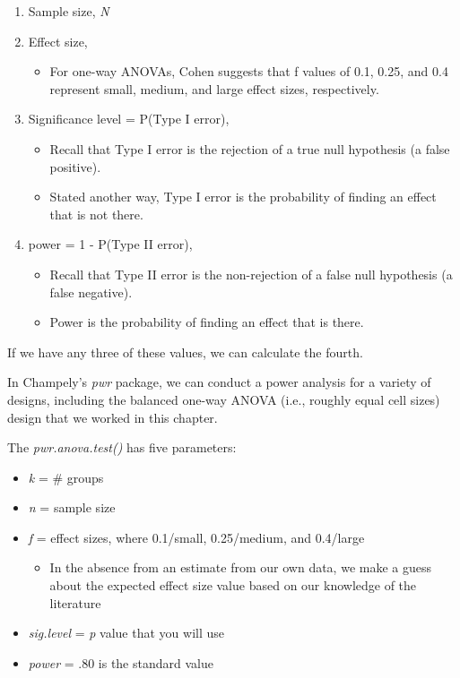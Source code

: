 \documentclass[
  english,
]{book}
\providecommand{\tightlist}{%
  \setlength{\itemsep}{0pt}\setlength{\parskip}{0pt}}
\begin{document}
\begin{enumerate}
\def\labelenumi{\arabic{enumi}.}
\tightlist
\item
  Sample size, \emph{N}
\item
  Effect size,

  \begin{itemize}
  \tightlist
  \item
    For one-way ANOVAs, Cohen suggests that f values of 0.1, 0.25, and 0.4 represent small, medium, and large effect sizes, respectively.
  \end{itemize}
\item
  Significance level = P(Type I error),

  \begin{itemize}
  \tightlist
  \item
    Recall that Type I error is the rejection of a true null hypothesis (a false positive).
  \item
    Stated another way, Type I error is the probability of finding an effect that is not there.
  \end{itemize}
\item
  power = 1 - P(Type II error),

  \begin{itemize}
  \tightlist
  \item
    Recall that Type II error is the non-rejection of a false null hypothesis (a false negative).
  \item
    Power is the probability of finding an effect that is there.
  \end{itemize}
\end{enumerate}

If we have any three of these values, we can calculate the fourth.

In Champely's \emph{pwr} package, we can conduct a power analysis for a variety of designs, including the balanced one-way ANOVA (i.e., roughly equal cell sizes) design that we worked in this chapter.

The \emph{pwr.anova.test()} has five parameters:

\begin{itemize}
\tightlist
\item
  \emph{k} = \# groups
\item
  \emph{n} = sample size
\item
  \emph{f} = effect sizes, where 0.1/small, 0.25/medium, and 0.4/large

  \begin{itemize}
  \tightlist
  \item
    In the absence from an estimate from our own data, we make a guess about the expected effect size value based on our knowledge of the literature
  \end{itemize}
\item
  \emph{sig.level} = \emph{p} value that you will use
\item
  \emph{power} = .80 is the standard value
\end{itemize}
\end{document}
